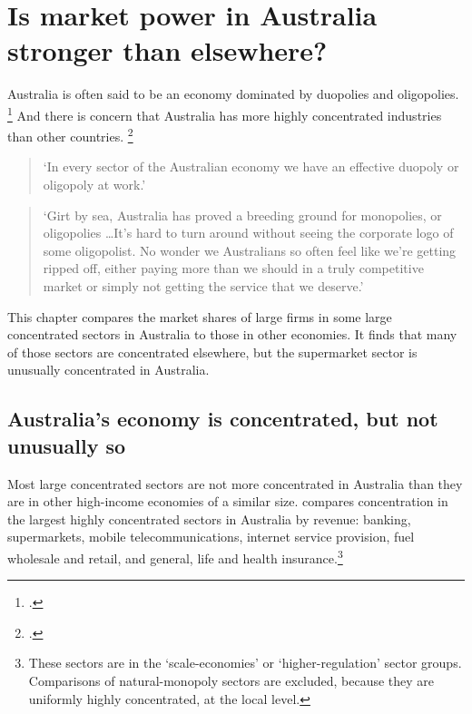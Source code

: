 \chapter{Is market power in Australia stronger than elsewhere?\label{chap:international}}

Australia is often said to be an economy dominated by duopolies and oligopolies.%
    \footcite{Macrobusiness_duopoly_2017}
And there is concern that Australia has more highly concentrated industries than other countries.%
    \footcite{Ritter-Guardian-2013}

\begin{quote}
    `In every sector of the Australian economy we have an effective duopoly or oligopoly at work.'

\end{quote}

\begin{quote}
    `Girt by sea, Australia has proved a breeding ground for monopolies, or oligopolies \dots It's hard to turn around without seeing the corporate logo of some oligopolist. No wonder we Australians so often feel like we're getting ripped off, either paying more than we should in a truly competitive market or simply not getting the service that we deserve.'

\end{quote}     

This chapter compares the market shares of large firms in some large concentrated sectors in Australia to those in other economies. It finds that many of those sectors are concentrated elsewhere, but the supermarket sector is unusually concentrated in Australia. 

\section{Australia's economy is concentrated, but not unusually so \label{sec:int_comp}}

Most large concentrated sectors are not more concentrated in Australia than they are in other high-income economies of a similar size.  compares concentration in the largest highly concentrated sectors in Australia by revenue: banking, supermarkets, mobile telecommunications, internet service provision, fuel wholesale and retail, and general, life and health insurance.\footnote{These sectors are in the `scale-economies' or `higher-regulation' sector groups. Comparisons of natural-monopoly sectors are excluded, because they are uniformly highly concentrated, at the local level.}

